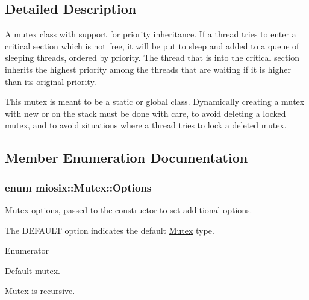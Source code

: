 \subsection{Detailed Description}
A mutex class with support for priority inheritance. If a thread tries to enter a critical section which is not free, it will be put to sleep and added to a queue of sleeping threads, ordered by priority. The thread that is into the critical section inherits the highest priority among the threads that are waiting if it is higher than its original priority.\par
 This mutex is meant to be a static or global class. Dynamically creating a mutex with new or on the stack must be done with care, to avoid deleting a locked mutex, and to avoid situations where a thread tries to lock a deleted mutex.\par
 

\subsection{Member Enumeration Documentation}
\hypertarget{classmiosix_1_1_mutex_acdb0fa35e637a14b1504a8f58c8bba2f}{
\subsubsection[{Options}]{\setlength{\rightskip}{0pt plus 5cm}enum {\bf miosix\-::\-Mutex\-::\-Options}}}\label{classmiosix_1_1_mutex_acdb0fa35e637a14b1504a8f58c8bba2f}
\hyperlink{classmiosix_1_1_mutex}{Mutex} options, passed to the constructor to set additional options.\par
 The D\-E\-F\-A\-U\-L\-T option indicates the default \hyperlink{classmiosix_1_1_mutex}{Mutex} type. \begin{Desc}
\item[Enumerator]\par
\begin{description}
\item[{\em 
\hypertarget{classmiosix_1_1_mutex_acdb0fa35e637a14b1504a8f58c8bba2fa84dda8357cdf60e9ce2b81c0f78c36d8}{D\-E\-F\-A\-U\-L\-T}\label{classmiosix_1_1_mutex_acdb0fa35e637a14b1504a8f58c8bba2fa84dda8357cdf60e9ce2b81c0f78c36d8}
}]Default mutex. \item[{\em 
\hypertarget{classmiosix_1_1_mutex_acdb0fa35e637a14b1504a8f58c8bba2fadadaee3cc9d507680b8652a09c3de4a5}{R\-E\-C\-U\-R\-S\-I\-V\-E}\label{classmiosix_1_1_mutex_acdb0fa35e637a14b1504a8f58c8bba2fadadaee3cc9d507680b8652a09c3de4a5}
}]\hyperlink{classmiosix_1_1_mutex}{Mutex} is recursive. \end{description}
\end{Desc}


